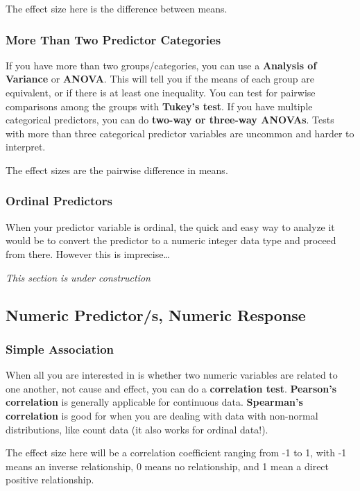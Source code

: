 \documentclass[
  letterpaper,
  DIV=11,
  numbers=noendperiod]{scrreprt}
\begin{document}
The effect size here is the difference between means.

\subsubsection{More Than Two Predictor Categories}\label{sec-anova}

If you have more than two groups/categories, you can use a
\textbf{Analysis of Variance} or \textbf{ANOVA}. This will tell you if
the means of each group are equivalent, or if there is at least one
inequality. You can test for pairwise comparisons among the groups with
\textbf{Tukey's test}. If you have multiple categorical predictors, you
can do \textbf{two-way or three-way ANOVAs}. Tests with more than three
categorical predictor variables are uncommon and harder to interpret.

The effect sizes are the pairwise difference in means.

\subsubsection{Ordinal Predictors}\label{ordinal-predictors}

When your predictor variable is ordinal, the quick and easy way to
analyze it would be to convert the predictor to a numeric integer data
type and proceed from there. However this is imprecise\ldots{}

\emph{This section is under construction}

\subsection{Numeric Predictor/s, Numeric
Response}\label{numeric-predictors-numeric-response}

\subsubsection{Simple Association}\label{sec-corr}

When all you are interested in is whether two numeric variables are
related to one another, not cause and effect, you can do a
\textbf{correlation test}. \textbf{Pearson's correlation} is generally
applicable for continuous data. \textbf{Spearman's correlation} is good
for when you are dealing with data with non-normal distributions, like
count data (it also works for ordinal data!).

The effect size here will be a correlation coefficient ranging from -1
to 1, with -1 means an inverse relationship, 0 means no relationship,
and 1 mean a direct positive relationship.
\end{document}

